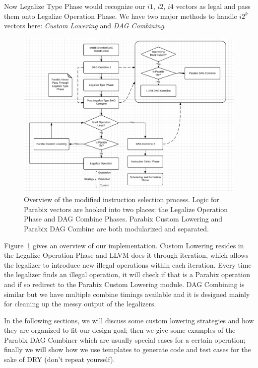 Now Legalize Type Phase would recognize our $i1$, $i2$, $i4$ vectors as legal and pass them onto Legalize Operation Phase. We have two major methods to handle $i2^k$ vectors here: \textit{Custom Lowering} and \textit{DAG Combining}.

\begin{figure}[ht!]
\centering
\includegraphics[width=140mm]{draw/system.png}
\caption[System overview: modified instruction selection process]{Overview of the modified instruction selection process. Logic for Parabix vectors are hooked into two places: the Legalize Operation Phase and DAG Combine Phases. Parabix Custom Lowering and Parabix DAG Combine are both modularized and separated.}
\label{figure:system}
\end{figure}

Figure~\ref{figure:system} gives an overview of our implementation. Custom Lowering resides in the Legalize Operation Phase and LLVM does it through iteration, which allows the legalizer to introduce new illegal operations within each iteration. Every time the legalizer finds an illegal operation, it will check if that is a Parabix operation and if so redirect to the Parabix Custom Lowering module. DAG Combining is similar but we have multiple combine timings available and it is designed mainly for cleaning up the messy output of the legalizers.

In the following sections, we will discuss some custom lowering strategies and how they are organized to fit our design goal; then we give some examples of the Parabix DAG Combiner which are usually special cases for a certain operation; finally we will show how we use templates to generate code and test cases for the sake of DRY (don't repeat yourself).

